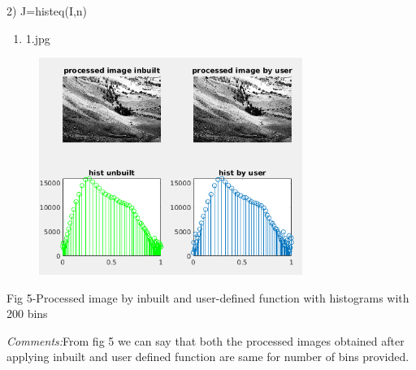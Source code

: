 \documentclass[12pt]{article}
\begin{document}
\vspace{\baselineskip}
\begin{justify}
2) J=histeq(I,n)
\end{justify}\par

\begin{enumerate}
	\item 1.jpg
\end{enumerate}\par




\begin{figure}[H]
	\begin{Center}
		\includegraphics[width=3.38in,height=2.78in]{./media/image21.png}
	\end{Center}
\end{figure}



\par

\begin{adjustwidth}{1.0in}{0.0in}
\begin{Center}
Fig 5-Processed image by inbuilt and user-defined function with histograms with 200 bins
\end{Center}\par

\end{adjustwidth}


\vspace{\baselineskip}
\begin{adjustwidth}{1.0in}{0.0in}
\begin{justify}
\textit{Comments:}From fig 5 we can say that both the processed images obtained after applying inbuilt and user defined function are same for number of bins provided.
\end{justify}\par

\end{adjustwidth}
\end{document}

